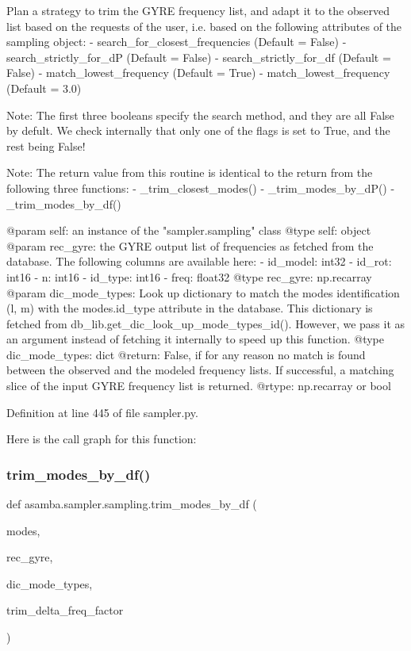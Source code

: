 \begin{DoxyVerb}Plan a strategy to trim the GYRE frequency list, and adapt it to the observed list based on the 
requests of the user, i.e. based on the following attributes of the sampling object: 
- search_for_closest_frequencies (Default = False)
- search_strictly_for_dP (Default = False)
- search_strictly_for_df (Default = False)
- match_lowest_frequency (Default = True)
- match_lowest_frequency (Default = 3.0)

Note: The first three booleans specify the search method, and they are all False by defult. We check
internally that only one of the flags is set to True, and the rest being False!

Note: The return value from this routine is identical to the return from the following three functions:
- _trim_closest_modes()
- _trim_modes_by_dP()
- _trim_modes_by_df()

@param self: an instance of the "sampler.sampling" class
@type self: object
@param rec_gyre: the GYRE output list of frequencies as fetched from the database. The following
     columns are available here:
     - id_model: int32
     - id_rot: int16
     - n: int16
     - id_type: int16
     - freq: float32
@type rec_gyre: np.recarray
@param dic_mode_types: Look up dictionary to match the modes identification (l, m) with the modes.id_type
  attribute in the database. This dictionary is fetched from db_lib.get_dic_look_up_mode_types_id(). 
  However, we pass it as an argument instead of fetching it internally to speed up this function.
@type dic_mode_types: dict
@return: False, if for any reason no match is found between the observed and the modeled frequency lists.
     If successful, a matching slice of the input GYRE frequency list is returned.
@rtype: np.recarray or bool
\end{DoxyVerb}
 

Definition at line 445 of file sampler.\+py.

Here is the call graph for this function\+:
\mbox{\label{classasamba_1_1sampler_1_1sampling_a0fe5ca163f5e1c07a017783818535579}} 
\subsubsection{\texorpdfstring{trim\+\_\+modes\+\_\+by\+\_\+df()}{trim\_modes\_by\_df()}}
{\footnotesize\ttfamily def asamba.\+sampler.\+sampling.\+trim\+\_\+modes\+\_\+by\+\_\+df (\begin{DoxyParamCaption}\item[{}]{modes,  }\item[{}]{rec\+\_\+gyre,  }\item[{}]{dic\+\_\+mode\+\_\+types,  }\item[{}]{trim\+\_\+delta\+\_\+freq\+\_\+factor }\end{DoxyParamCaption})}

